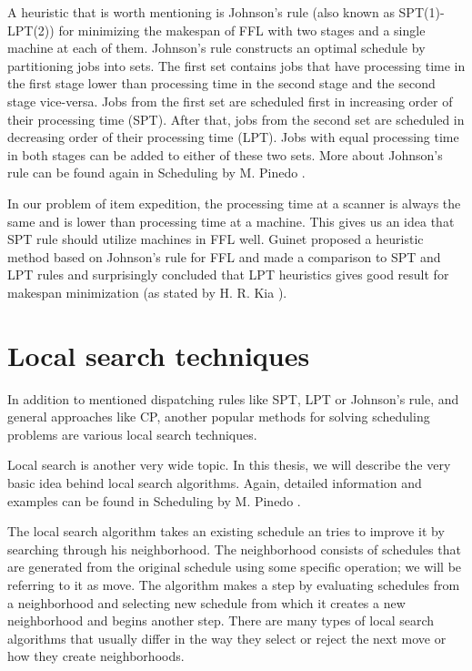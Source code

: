 \documentclass{ctuthesis}
\begin{document}
A heuristic that is worth mentioning is Johnson's rule (also known as SPT(1)-LPT(2)) for minimizing the makespan of FFL with two stages and a single machine at each of them. Johnson's rule constructs an optimal schedule by partitioning jobs into sets. The first set contains jobs that have processing time in the first stage lower than processing time in the second stage and the second stage vice-versa. 
Jobs from the first set are scheduled first in increasing order of their processing time (SPT). After that, jobs from the second set are scheduled in decreasing order of their processing time (LPT). Jobs with equal processing time in both stages can be added to either of these two sets. More about Johnson's rule can be found again in Scheduling by M. Pinedo \cite{pinedo}.

In our problem of item expedition, the processing time at a scanner is always the same and is lower than processing time at a machine. This gives us an idea that SPT rule should utilize machines in FFL well. Guinet \cite{guinet} proposed a heuristic method based on Johnson's rule for FFL and made a comparison to SPT and LPT rules and surprisingly concluded that LPT heuristics gives good result for makespan minimization (as stated by H. R. Kia \cite{kia}).



\section{Local search techniques}

In addition to mentioned dispatching rules like SPT, LPT or Johnson's rule, and general approaches like CP, another popular methods for solving scheduling problems are various local search techniques.

Local search is another very wide topic. In this thesis, we will describe the very basic idea behind local search algorithms. Again, detailed information and examples can be found in Scheduling by M. Pinedo \cite{pinedo}. 

The local search algorithm takes an existing schedule an tries to improve it by searching through his neighborhood. The neighborhood consists of schedules that are generated from the original schedule using some specific operation; we will be referring to it as move. The algorithm makes a step by evaluating schedules from a neighborhood and selecting new schedule from which it creates a new neighborhood and begins another step. There are many types of local search algorithms that usually differ in the way they select or reject the next move or how they create neighborhoods. 
\end{document}

